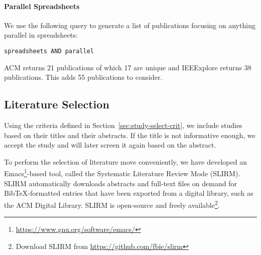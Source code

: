 \documentclass[a4paper]{article}
\begin{document}
\paragraph{Parallel Spreadsheets}

We use the following query to generate a list of publications focusing on anything parallel in spreadsheets:

\begin{lstlisting}
spreadsheets AND parallel
\end{lstlisting}

\noindent ACM returns 21 publications of which 17 are unique and IEEExplore returns 38 publications. This adds 55 publications to consider.

\subsection{Literature Selection}
\label{sec:literature-selection}

Using the criteria defined in Section~\ref{sec:study-select-crit}, we include studies based on their titles and their abstracts. If the title is not informative enough, we accept the study and will later screen it again based on the abstract.

To perform the selection of literature move conveniently, we have developed an Emacs\footnote{\url{https://www.gnu.org/software/emacs/}}-based tool, called the Systematic Literature Review Mode (SLIRM). SLIRM automatically downloads abstracts and full-text files on demand for BibTeX-formatted entries that have been exported from a digital library, such as the ACM Digital Library. SLIRM is open-source and freely available\footnote{Download SLIRM from
  \url{https://github.com/fbie/slirm}}.
\end{document}
